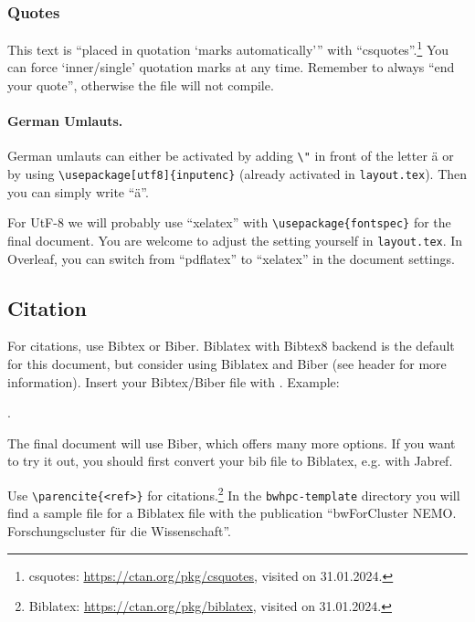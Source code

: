 \documentclass[
  paper       = a4,
  headheight  = 16pt,
  footheight  = 16pt,
  fontsize    = 10pt,
  twoside     = true,
  titlepage   = true,
]{scrartcl}
\begin{document}
\subsubsection{Quotes}

This text is \enquote{placed in quotation \enquote{marks automatically}} with \enquote{csquotes}.\footnote{csquotes: \url{https://ctan.org/pkg/csquotes}, visited on 31.01.2024.}
You can force \enquote*{inner/single} quotation marks at any time.
Remember to always \enquote{end your quote}, otherwise the file will not compile.


\paragraph{German Umlauts.}

German umlauts can either be activated by adding \lstinline|\"| in front of the letter \"a or by using \verb|\usepackage[utf8]{inputenc}| (already activated in \lstinline|layout.tex|).
Then you can simply write \enquote{ä}.

For UtF-8 we will probably use \enquote{xelatex} with \verb|\usepackage{fontspec}| for the final document.
You are welcome to adjust the setting yourself in \lstinline|layout.tex|.
In Overleaf, you can switch from \enquote{pdflatex} to \enquote{xelatex} in the document settings.


\subsection{Citation}

For citations, use Bibtex or Biber. Biblatex with Bibtex8 backend is the default for this document, but consider using Biblatex and Biber (see header for more information). Insert your Bibtex/Biber file with \verb||. Example:

\verb||.

The final document will use Biber, which offers many more options.
If you want to try it out, you should first convert your bib file to Biblatex, e.g. with Jabref.

Use \verb|\parencite{<ref>}| for citations.\footnote{Biblatex: \url{https://ctan.org/pkg/biblatex}, visited on 31.01.2024.}
In the \verb|bwhpc-template| directory you will find a sample file for a Biblatex file with the publication \enquote{bwForCluster NEMO. Forschungscluster für die Wissenschaft}\parencite{bwhpc2019:janczyk_bwforcluster}.
\end{document}
